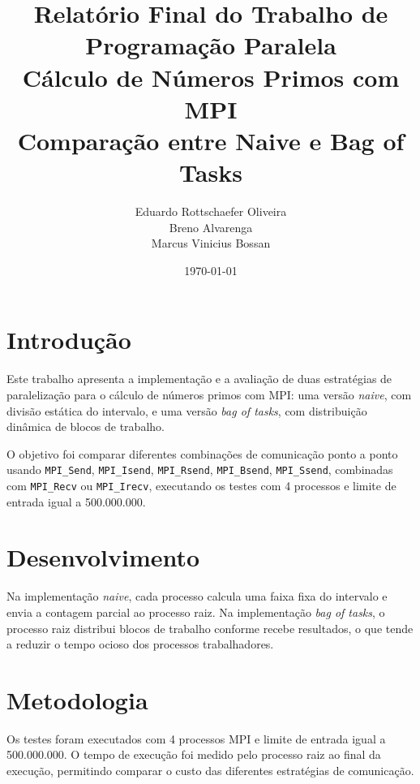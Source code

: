 \documentclass[12pt,a4paper]{article}
\begin{document}
\title{
    \textbf{Relatório Final do Trabalho de Programação Paralela} \\[0.5em]
    \large Cálculo de Números Primos com MPI \\[0.3em]
    \normalsize Comparação entre Naive e Bag of Tasks
}
\author{
    Eduardo Rottschaefer Oliveira \\
    Breno Alvarenga \\
    Marcus Vinicius Bossan \\
}
\date{\today}

\maketitle
\thispagestyle{empty}

\newpage
\tableofcontents
\newpage

\section{Introdução}
Este trabalho apresenta a implementação e a avaliação de duas estratégias de paralelização para o cálculo de números primos com MPI: uma versão \textit{naive}, com divisão estática do intervalo, e uma versão \textit{bag of tasks}, com distribuição dinâmica de blocos de trabalho.

O objetivo foi comparar diferentes combinações de comunicação ponto a ponto usando \texttt{MPI\_Send}, \texttt{MPI\_Isend}, \texttt{MPI\_Rsend}, \texttt{MPI\_Bsend}, \texttt{MPI\_Ssend}, combinadas com \texttt{MPI\_Recv} ou \texttt{MPI\_Irecv}, executando os testes com 4 processos e limite de entrada igual a 500.000.000.

\section{Desenvolvimento}

Na implementação \textit{naive}, cada processo calcula uma faixa fixa do intervalo e envia a contagem parcial ao processo raiz. Na implementação \textit{bag of tasks}, o processo raiz distribui blocos de trabalho conforme recebe resultados, o que tende a reduzir o tempo ocioso dos processos trabalhadores.

\section{Metodologia}
Os testes foram executados com 4 processos MPI e limite de entrada igual a 500.000.000. O tempo de execução foi medido pelo processo raiz ao final da execução, permitindo comparar o custo das diferentes estratégias de comunicação.
\end{document}
